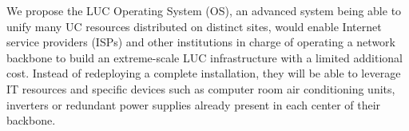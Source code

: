 We propose the LUC Operating System (OS), an advanced system being able to unify
many UC resources distributed on distinct sites, would enable Internet service 
providers (ISPs) and other institutions in charge of operating a network 
backbone to build an extreme-scale LUC infrastructure with a limited additional 
cost. Instead of redeploying a complete installation, they will be able to 
leverage IT resources and specific devices such as computer room air 
conditioning units, inverters or redundant power supplies already present in 
each center of their backbone.



